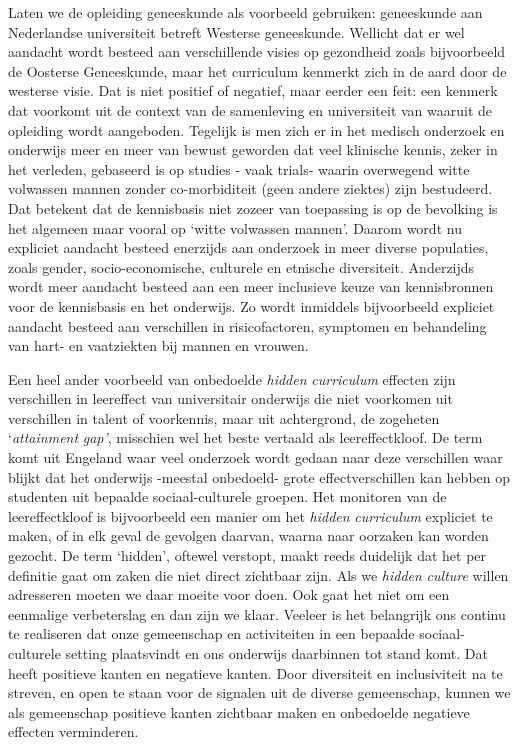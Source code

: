 \documentclass[smallauthor, chapterhaspagenum, nochapterinheader, pagenuminheader,  bigchapnum,medium2, tocpages, garamond, titleinheader]{jote-book}
\begin{document}
	Laten we de opleiding geneeskunde als voorbeeld gebruiken: geneeskunde aan Nederlandse universiteit betreft Westerse geneeskunde. Wellicht dat er wel aandacht wordt besteed aan verschillende visies op gezondheid zoals bijvoorbeeld de Oosterse Geneeskunde, maar het curriculum kenmerkt zich in de aard door de westerse visie. Dat is niet positief of negatief, maar eerder een feit: een kenmerk dat voorkomt uit de context van de samenleving en universiteit van waaruit de opleiding wordt aangeboden. Tegelijk is men zich er in het medisch onderzoek en onderwijs meer en meer van bewust geworden dat veel klinische kennis, zeker in het verleden, gebaseerd is op studies - vaak trials- waarin overwegend witte volwassen mannen zonder co-morbiditeit (geen andere ziektes) zijn bestudeerd. Dat betekent dat de kennisbasis niet zozeer van toepassing is op de bevolking is het algemeen maar vooral op ‘witte volwassen mannen'. Daarom wordt nu expliciet aandacht besteed enerzijds aan onderzoek in meer diverse populaties, zoals gender, socio-economische, culturele en etnische diversiteit. Anderzijds wordt meer aandacht besteed aan een meer inclusieve keuze van kennisbronnen voor de kennisbasis en het onderwijs. Zo wordt inmiddels bijvoorbeeld expliciet aandacht besteed aan verschillen in risicofactoren, symptomen en behandeling van hart- en vaatziekten bij mannen en vrouwen.

	\enlargethispage{-\baselineskip}\checkandfixthelayout

	Een heel ander voorbeeld van onbedoelde \emph{hidden}\emph{ curriculum} effecten zijn verschillen in leereffect van universitair onderwijs die niet voorkomen uit verschillen in talent of voorkennis, maar uit achtergrond, de zogeheten ‘\emph{attainment}\emph{ gap}\emph{'}, misschien wel het beste vertaald als leereffectkloof. De term komt uit Engeland waar veel onderzoek wordt gedaan naar deze verschillen waar blijkt dat het onderwijs -meestal onbedoeld- grote effectverschillen kan hebben op studenten uit bepaalde sociaal-culturele groepen. Het monitoren van de leereffectkloof is bijvoorbeeld een manier om het \emph{hidden}\emph{ curriculum} expliciet te maken, of in elk geval de gevolgen daarvan, waarna naar oorzaken kan worden gezocht. De term ‘hidden', oftewel verstopt, maakt reeds duidelijk dat het per definitie gaat om zaken die niet direct zichtbaar zijn. Als we \emph{hidden}\emph{ culture} willen adresseren moeten we daar moeite voor doen. Ook gaat het niet om een eenmalige verbeterslag en dan zijn we klaar. Veeleer is het belangrijk ons continu te realiseren dat onze gemeenschap en activiteiten in een bepaalde sociaal-culturele setting plaatsvindt en ons onderwijs daarbinnen tot stand komt. Dat heeft positieve kanten en negatieve kanten. Door diversiteit en inclusiviteit na te streven, en open te staan voor de signalen uit de diverse gemeenschap, kunnen we als gemeenschap positieve kanten zichtbaar maken en onbedoelde negatieve effecten verminderen.
\end{document}
